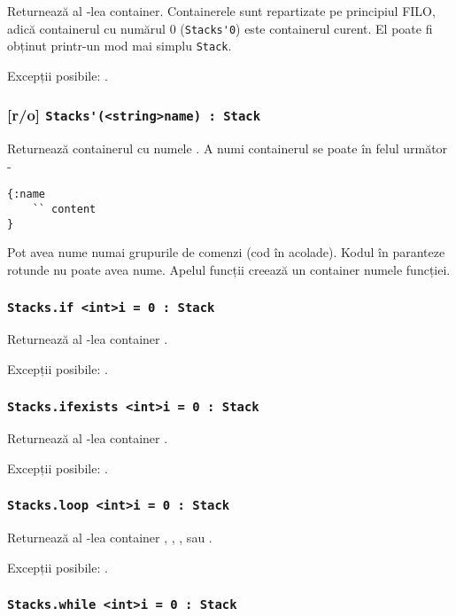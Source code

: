 Returnează al -lea container. Containerele sunt repartizate pe principiul FILO, adică containerul cu numărul 0  (\lstinline|Stacks'0|) este containerul curent. El poate fi obținut printr-un mod mai simplu \lstinline|Stack|.

Excepții posibile: .

\subsubsection{[r/o] \lstinline|Stacks'(<string>name) : Stack|}

Returnează containerul cu numele . A numi containerul se poate în felul următor -
\begin{lstlisting}[numbers=none]
{:name
	`` content
}
\end{lstlisting}
Pot avea nume numai grupurile de comenzi (cod în acolade). Kodul în paranteze rotunde nu poate avea nume. Apelul funcții creează un container numele funcției.

\subsubsection{\lstinline|Stacks.if <int>i = 0 : Stack|}

Returnează al -lea container .

Excepții posibile: .

\subsubsection{\lstinline|Stacks.ifexists <int>i = 0 : Stack|}

Returnează al -lea container .

Excepții posibile: .

\subsubsection{\lstinline|Stacks.loop <int>i = 0 : Stack|}

Returnează al -lea container , , ,  sau .

Excepții posibile: .

\subsubsection{\lstinline|Stacks.while <int>i = 0 : Stack|}

